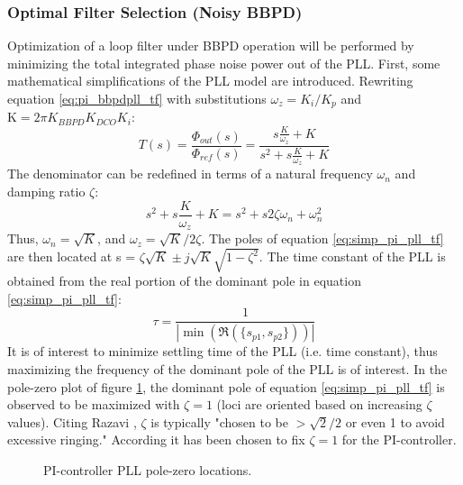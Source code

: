 \subsubsection{Optimal Filter Selection (Noisy BBPD)}\label{sec:opt_lf_noisy_bbpd}
			Optimization of a loop filter under BBPD operation will be performed by minimizing the total integrated phase noise power out of the PLL. First, some mathematical simplifications of the PLL model are introduced. Rewriting equation \ref{eq:pi_bbpdpll_tf} with substitutions $\omega_z = K_i/K_p$ and $\mathrm{K} = 2\pi K_{BBPD}K_{DCO}K_{i}$:
			\begin{equation} \label{eq:simp_pi_pll_tf}
				T(s) = \frac{\Phi_{out}(s)}{\Phi_{ref}(s)} = \frac{s\frac{K}{\omega_z} + K }{s^2 + s\frac{K}{\omega_z} + K}
			\end{equation}
			The denominator can be redefined in terms of a natural frequency $\omega_n$ and damping ratio $\zeta$:
			\begin{equation}
				s^2 + s\frac{K}{\omega_z} + K = s^2 + s2\zeta\omega_n + \omega_n^2
			\end{equation}
			Thus, $\omega_n = \sqrt{K}$, and $\omega_z = \sqrt{K}/2\zeta$. The poles of equation \ref{eq:simp_pi_pll_tf} are then located at s = $\zeta\sqrt{K} \pm j\sqrt{K}\sqrt{1-\zeta^2}$. The time constant of the PLL is obtained from the real portion of the dominant pole in equation \ref{eq:simp_pi_pll_tf}:
			\begin{equation}
				\tau = \frac{1}{|\min(\Re(\{s_{p1}, s_{p2}\}))|}
			\end{equation}
			 It is of interest to minimize settling time of the PLL (i.e. time constant), thus maximizing the frequency of the dominant pole of the PLL is of interest. In the pole-zero plot of figure \ref{fig:pi_pll_pz}, the dominant pole of equation \ref{eq:simp_pi_pll_tf} is observed to be maximized with $\zeta=1$ (loci are oriented based on increasing $\zeta$ values). Citing Razavi \cite{razavi_2017}, $\zeta$ is typically 
			"chosen to be $>\sqrt{2}/2$ or even 1 to avoid excessive ringing." According it has been chosen to fix $\zeta=1$ for the PI-controller. 
			\begin{figure}[htb!]
				\center
				\caption{PI-controller PLL pole-zero locations.}
				\label{fig:pi_pll_pz}
			\end{figure}
			\FloatBarrier
